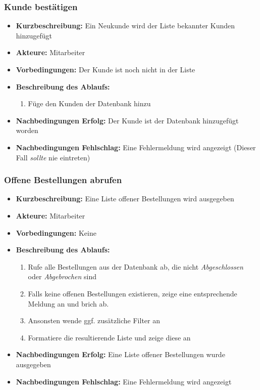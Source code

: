 \documentclass[a4paper]{report}
\begin{document}
\subsubsection*{Kunde bestätigen}
\begin{itemize}
    \item \textbf{Kurzbeschreibung:} Ein Neukunde wird der Liste bekannter Kunden hinzugefügt
    \item \textbf{Akteure:} Mitarbeiter
    \item \textbf{Vorbedingungen:} Der Kunde ist noch nicht in der Liste
    \item \textbf{Beschreibung des Ablaufs:}
        \begin{enumerate}
            \item Füge den Kunden der Datenbank hinzu
        \end{enumerate}
    \item \textbf{Nachbedingungen Erfolg:} Der Kunde ist der Datenbank hinzugefügt worden
    \item \textbf{Nachbedingungen Fehlschlag:} Eine Fehlermeldung wird angezeigt (Dieser Fall \textit{sollte} nie eintreten)
\end{itemize}
%
\subsubsection*{Offene Bestellungen abrufen}
\begin{itemize}
    \item \textbf{Kurzbeschreibung:} Eine Liste offener Bestellungen wird ausgegeben
    \item \textbf{Akteure:} Mitarbeiter
    \item \textbf{Vorbedingungen:} Keine
    \item \textbf{Beschreibung des Ablaufs:}
        \begin{enumerate}
            \item Rufe alle Bestellungen aus der Datenbank ab, die nicht \textit{Abgeschlossen} oder \textit{Abgebrochen} sind
            \item Falls keine offenen Bestellungen existieren, zeige eine entsprechende Meldung an und brich ab.
            \item Ansonsten wende ggf. zusätzliche Filter an
            \item Formatiere die resultierende Liste und zeige diese an
        \end{enumerate}
    \item \textbf{Nachbedingungen Erfolg:} Eine Liste offener Bestellungen wurde ausgegeben
    \item \textbf{Nachbedingungen Fehlschlag:} Eine Fehlermeldung wird angezeigt 
\end{itemize}
%
\end{document}
